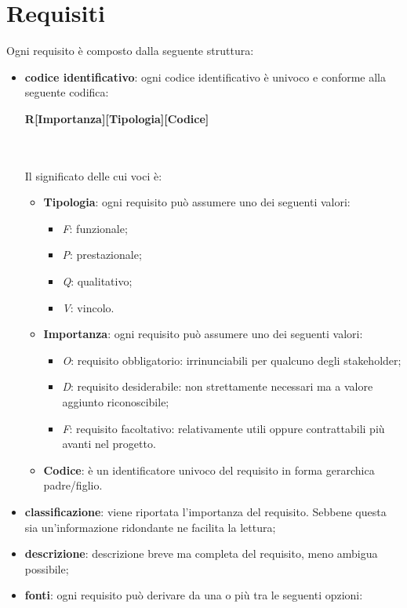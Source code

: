 
\section{Requisiti} 
Ogni requisito è composto dalla seguente struttura:
\begin{itemize}
	\item \textbf{codice identificativo}: ogni codice identificativo è univoco e conforme alla seguente codifica: \\
	\centerline{\textbf{R[Importanza][Tipologia][Codice]}} \\ \\
	Il significato delle cui voci è:
	\begin{itemize}
		\item \textbf{Tipologia}: ogni requisito può assumere uno dei seguenti valori:
		\begin{itemize}
			\item \textit{F}: funzionale;
			\item \textit{P}: prestazionale;
			\item \textit{Q}: qualitativo;
			\item \textit{V}: vincolo.
		\end{itemize}
		\item \textbf{Importanza}: ogni requisito può assumere uno dei seguenti valori:
		\begin{itemize}
			\item \textit{O}: requisito obbligatorio: irrinunciabili per qualcuno degli stakeholder;
			\item \textit{D}: requisito desiderabile: non strettamente necessari ma  a valore aggiunto riconoscibile;
			\item \textit{F}: requisito facoltativo: relativamente utili oppure contrattabili più avanti nel progetto.	
		\end{itemize}
		\item \textbf{Codice}: è un identificatore univoco del requisito in forma gerarchica padre/figlio.
	\end{itemize}
	\item \textbf{classificazione}: viene riportata l'importanza del requisito. Sebbene questa sia un'informazione ridondante ne facilita la lettura;
	\item \textbf{descrizione}: descrizione breve ma completa del requisito, meno ambigua possibile;
	\item \textbf{fonti}: ogni requisito può derivare da una o più tra le seguenti opzioni:
	\begin{itemize}

\end{itemize}
\end{itemize}
